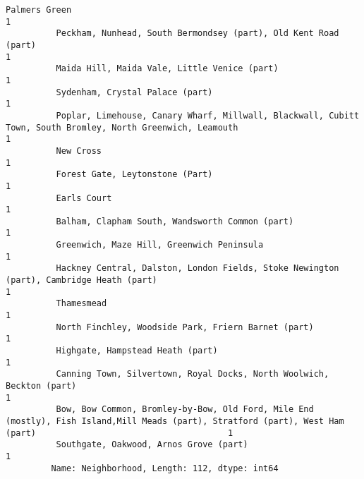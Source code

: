 \documentclass[11pt]{article}
\begin{document}
\begin{Verbatim}[commandchars=\\\{\}]
          Palmers Green                                                                                                                                                       1
          Peckham, Nunhead, South Bermondsey (part), Old Kent Road (part)                                                                                                     1
          Maida Hill, Maida Vale, Little Venice (part)                                                                                                                        1
          Sydenham, Crystal Palace (part)                                                                                                                                     1
          Poplar, Limehouse, Canary Wharf, Millwall, Blackwall, Cubitt Town, South Bromley, North Greenwich, Leamouth                                                         1
          New Cross                                                                                                                                                           1
          Forest Gate, Leytonstone (Part)                                                                                                                                     1
          Earls Court                                                                                                                                                         1
          Balham, Clapham South, Wandsworth Common (part)                                                                                                                     1
          Greenwich, Maze Hill, Greenwich Peninsula                                                                                                                           1
          Hackney Central, Dalston, London Fields, Stoke Newington (part), Cambridge Heath (part)                                                                             1
          Thamesmead                                                                                                                                                          1
          North Finchley, Woodside Park, Friern Barnet (part)                                                                                                                 1
          Highgate, Hampstead Heath (part)                                                                                                                                    1
          Canning Town, Silvertown, Royal Docks, North Woolwich, Beckton (part)                                                                                               1
          Bow, Bow Common, Bromley-by-Bow, Old Ford, Mile End (mostly), Fish Island,Mill Meads (part), Stratford (part), West Ham (part)                                      1
          Southgate, Oakwood, Arnos Grove (part)                                                                                                                              1
         Name: Neighborhood, Length: 112, dtype: int64
\end{Verbatim}
            
\end{document}
